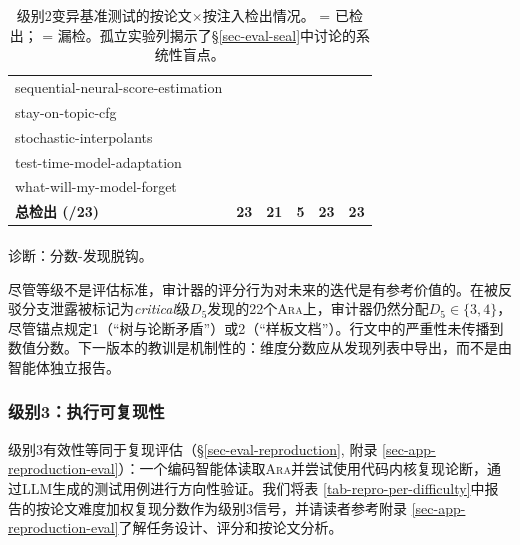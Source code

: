 \documentclass[
]{article}
\makeatletter
\let\oldparagraph\paragraph
\renewcommand{\paragraph}{
    \@ifstar
      \xxxParagraphStar
      \xxxParagraphNoStar
  }
\newcommand{\xxxParagraphStar}[1]{\oldparagraph*{#1}\mbox{}}
\newcommand{\xxxParagraphNoStar}[1]{\oldparagraph{#1}\mbox{}}
\newcommand{\cmark}{\textcolor{green!60!black}{\ding{51}}}
\newcommand{\xmark}{\textcolor{red!70!black}{\ding{55}}}
\theoremstyle{definition}
\newcommand{\ara}{\textsc{Ara}}
\makeatother
\begin{document}
\begin{table}[t]
\begin{tabular}{l | c c c c c}
sequential-neural-score-estimation         & \cmark & \cmark & \xmark & \cmark & \cmark \\
stay-on-topic-cfg                          & \cmark & \cmark & \xmark & \cmark & \cmark \\
stochastic-interpolants                    & \cmark & \cmark & \xmark & \cmark & \cmark \\
test-time-model-adaptation                 & \cmark & \cmark & \xmark & \cmark & \cmark \\
what-will-my-model-forget                  & \cmark & \cmark & \xmark & \cmark & \cmark \\
\midrule
\textbf{总检出 (/23)} & \textbf{23} & \textbf{21} & \textbf{5} & \textbf{23} & \textbf{23} \\
\bottomrule
\end{tabular}
\caption{级别2变异基准测试的按论文$\times$按注入检出情况。\cmark{} = 已检出；\xmark{} = 漏检。孤立实验列揭示了\S\ref{sec-eval-seal}中讨论的系统性盲点。}
\label{tab-seal-l2-heatmap}
\end{table}

\paragraph{诊断：分数-发现脱钩。}\label{ux8bcaux65adux5206ux6570-ux53d1ux73b0ux8131ux94a9}

尽管等级不是评估标准，审计器的评分行为对未来的迭代是有参考价值的。在被反驳分支泄露被标记为\emph{critical}级\(D_5\)发现的22个\ara{}上，审计器仍然分配\(D_5 \in \{3,4\}\)，尽管锚点规定1（``树与论断矛盾''）或2（``样板文档''）。行文中的严重性未传播到数值分数。下一版本的教训是机制性的：维度分数应从发现列表中导出，而不是由智能体独立报告。

\subsubsection{级别3：执行可复现性}\label{sec-app-seal-eval-l3}

级别3有效性等同于复现评估（\S\ref{sec-eval-reproduction}, 附录
\ref{sec-app-reproduction-eval}）：一个编码智能体读取\ara{}并尝试使用代码内核复现论断，通过LLM生成的测试用例进行方向性验证。我们将表
\ref{tab-repro-per-difficulty}中报告的按论文难度加权复现分数作为级别3信号，并请读者参考附录
\ref{sec-app-reproduction-eval}了解任务设计、评分和按论文分析。
\end{document}
